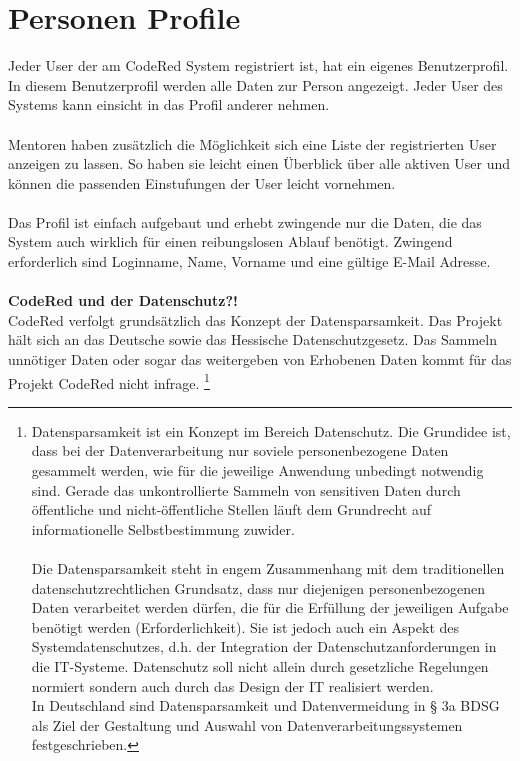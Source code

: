 \chapter{Personen Profile}  %
\label{chapter:Personen Profile}  %

Jeder User der am CodeRed System registriert ist, hat ein eigenes Benutzerprofil. In diesem Benutzerprofil werden alle Daten zur Person angezeigt. Jeder User des Systems kann einsicht in das Profil anderer nehmen. \\
\\
Mentoren haben zusätzlich die Möglichkeit sich eine Liste der registrierten User anzeigen zu lassen. So haben sie leicht einen Überblick über alle aktiven User und können die passenden Einstufungen der User leicht vornehmen. \\
\\
Das Profil ist einfach aufgebaut und erhebt zwingende nur die Daten, die das System auch wirklich für einen reibungslosen Ablauf benötigt. Zwingend erforderlich sind Loginname, Name, Vorname und eine gültige E-Mail Adresse.\\
\\
\textbf{CodeRed und der Datenschutz?!} \\
CodeRed verfolgt grundsätzlich das Konzept der Datensparsamkeit. Das Projekt hält sich an das Deutsche sowie das Hessische Datenschutzgesetz. Das Sammeln unnötiger Daten oder sogar das weitergeben von Erhobenen Daten kommt für das Projekt CodeRed nicht infrage.
\footnote[1]{Datensparsamkeit ist ein Konzept im Bereich Datenschutz. Die Grundidee ist, dass bei der Datenverarbeitung nur soviele personenbezogene Daten gesammelt werden, wie für die jeweilige Anwendung unbedingt notwendig sind. Gerade das unkontrollierte Sammeln von sensitiven Daten durch öffentliche und nicht-öffentliche Stellen läuft dem Grundrecht auf informationelle Selbstbestimmung zuwider.\\
\\
Die Datensparsamkeit steht in engem Zusammenhang mit dem traditionellen datenschutzrechtlichen Grundsatz, dass nur diejenigen personenbezogenen Daten verarbeitet werden dürfen, die für die Erfüllung der jeweiligen Aufgabe benötigt werden (Erforderlichkeit). Sie ist jedoch auch ein Aspekt des Systemdatenschutzes, d.h. der Integration der Datenschutzanforderungen in die IT-Systeme. Datenschutz soll nicht allein durch gesetzliche Regelungen normiert sondern auch durch das Design der IT realisiert werden.\\ In Deutschland sind Datensparsamkeit und Datenvermeidung in § 3a BDSG als Ziel der Gestaltung und Auswahl von Datenverarbeitungssystemen festgeschrieben.}
